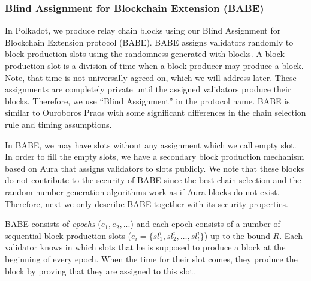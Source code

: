 \subsubsection{Blind Assignment for Blockchain Extension (BABE)}
\label{sec:babe}

In Polkadot, we produce relay chain blocks using our Blind Assignment for Blockchain Extension protocol (BABE).
BABE assigns validators randomly to block production slots using  the randomness generated with blocks. A block production slot is a division of time when a block producer may produce a block. Note, that time is not universally agreed on, which we will address later.  These assignments are completely private until the assigned validators produce their blocks. Therefore, we use ``Blind Assignment'' in the protocol name. BABE is similar to Ouroboros Praos \cite{Praos} with some significant differences in the chain selection rule and timing assumptions.

In BABE, we may have slots without any assignment
 which we call empty slot. 
In order to fill the empty slots, we have a
secondary block production mechanism based on Aura \cite{aura} that assigns validators to slots publicly. We note that these blocks do not contribute to
the security of BABE since the best chain selection and the random number generation algorithms work as if Aura blocks do not exist.
Therefore, next we only describe BABE together with its security properties.


BABE \cite{babe} consists of \emph{epochs} ($e_1,e_2,...$) and each epoch consists of a number of sequential block production slots (\(e_i = \{sl^i_{1}, sl^i_{2},\ldots,sl^i_{t}\}\)) up to the bound  $R$.
Each validator knows in which slots that he is supposed to produce a block at the beginning of every epoch. When the time for their slot comes, they produce the block by proving that they are assigned to
this slot.

